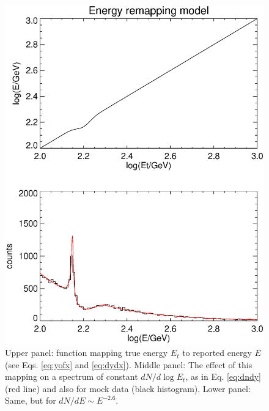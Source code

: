 \documentclass[aps,twocolumn,prd,superscriptaddress,showpacs,nofootinbib,fixfloat]{revtex4}
\begin{document}
\begin{figure}
  \centering
  \includegraphics[width=1.0\linewidth]{plots/limb_bump_model.ps}
  \caption{Upper panel: function mapping true energy $E_t$
  to reported energy $E$ (see Eqs. \ref{eq:yofx} and
  \ref{eq:dydx}).  Middle panel: The effect of this mapping
  on a spectrum of constant $dN/d\log E_t$, as in Eq.
  \ref{eq:dndy} (red line) and also for mock data (black
  histogram).  Lower panel: Same, but for $dN/dE \sim
  E^{-2.6}$.}
  \label{fig:bumpmodel}
\end{figure}
\end{document}
